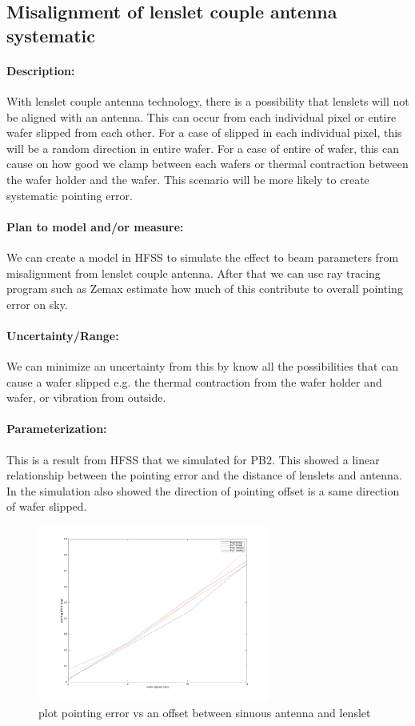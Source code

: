 \subsection{Misalignment of lenslet couple antenna systematic}

\paragraph{Description:}
With lenslet couple antenna technology, there is a possibility that lenslets will not be aligned with an antenna. This can occur from each individual pixel or entire wafer slipped from each other. For a case of  slipped in each individual pixel, this will be a random direction in entire wafer. For a case of entire of wafer, this can cause on how good we clamp between each wafers or thermal contraction between the wafer holder and the wafer. This scenario will be more likely to create systematic pointing error. 

\paragraph{Plan to model and/or measure:}
We can create a model in HFSS to simulate the effect to beam parameters from misalignment from lenslet couple antenna. After that we can use ray tracing program such as Zemax estimate how much of this contribute to overall pointing error on sky.

\paragraph{Uncertainty/Range:}
We can minimize an uncertainty from this by know all the possibilities that can cause a wafer slipped e.g. the thermal contraction from the wafer holder and wafer, or vibration from outside. 

\paragraph{Parameterization:}
This is a result from HFSS that we simulated for PB2. This showed a linear relationship between the pointing error and the distance of lenslets and antenna. In the simulation also showed the direction of pointing offset is a same direction of wafer slipped. 
  
\begin{figure}
\centering
\includegraphics[width=3in]{figures/pointingOffset_waferslipped.png}
\caption{plot pointing error vs an offset between sinuous antenna and lenslet }
\label{poitingoffsetFromWaferslipped}
\end{figure}

